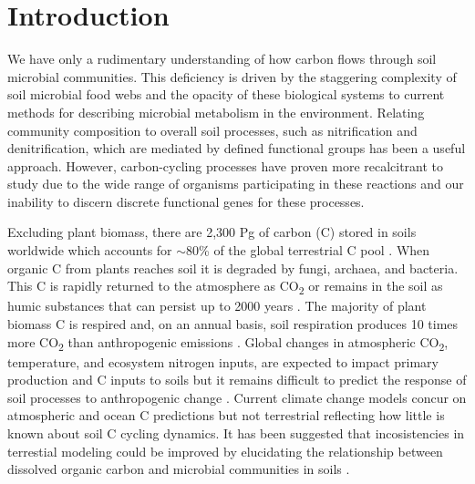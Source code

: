 \section{Introduction}
We have only a rudimentary understanding of how carbon flows through soil microbial communities. This deficiency is driven by the staggering complexity of soil microbial food webs and the opacity of these biological systems to current methods for describing microbial metabolism in the environment. Relating community composition to overall soil processes, such as nitrification and denitrification, which are mediated by defined functional groups has been a useful approach. However, carbon-cycling processes have proven more recalcitrant to study due to the wide range of organisms participating in these reactions and our inability to discern discrete functional genes for these processes.
 
Excluding plant biomass, there are 2,300 Pg of carbon (C) stored in soils worldwide which accounts for $\sim$80\% of the global terrestrial C pool \cite{Amundson_2001,BATJES_1996}. When organic C from plants reaches soil it is degraded by fungi, archaea, and bacteria. This C is rapidly returned to the atmosphere as CO\textsubscript{2} or remains in the soil as humic substances that can persist up to 2000 years \cite{yanagita1990natural}. The majority of plant biomass C is respired and, on an annual basis, soil respiration produces 10 times more CO\textsubscript{2} than anthropogenic emissions \cite{chapin2002principles}. Global changes in atmospheric CO\textsubscript{2}, temperature, and ecosystem nitrogen inputs, are expected to impact primary production and C inputs to soils \cite{Groenigen_2006} but it remains difficult to predict the response of soil processes to anthropogenic change \cite{DAVIDSON_2006}. Current climate change models concur on atmospheric and ocean C predictions but not terrestrial \cite{Friedlingstein_2006} reflecting how little is known about soil C cycling dynamics. It has been suggested that incosistencies in terrestial modeling could be improved by elucidating the relationship between dissolved organic carbon and microbial communities in soils \cite{Neff_2001}. 

